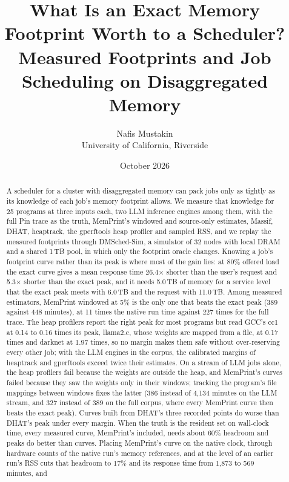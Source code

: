 \documentclass[11pt]{article}
\title{What Is an Exact Memory Footprint Worth to a Scheduler?\\
Measured Footprints and Job Scheduling on Disaggregated Memory}
\author{Nafis Mustakin\\University of California, Riverside}
\date{October 2026}
\newcommand{\memprint}{MemPrint}
\begin{document}
\maketitle

\begin{abstract}
A scheduler for a cluster with disaggregated memory can pack jobs only as tightly as its knowledge of each
job's memory footprint allows. We measure that knowledge for 25 programs at three inputs each, two LLM inference
engines among them, with the full Pin
trace as the truth, \memprint{}'s windowed and source-only estimates, Massif, DHAT, heaptrack, the gperftools heap
profiler and sampled RSS, and we replay the measured footprints through DMSched-Sim, a simulator of 32 nodes with
local DRAM and a shared 1\,TB pool, in which only the footprint oracle changes. Knowing a job's footprint curve
rather than its peak is where most of the gain lies: at 80\% offered load the exact curve gives a mean response
time 26.4$\times$ shorter than the user's request and 5.3$\times$ shorter than the exact peak, and it needs 5.0\,TB
of memory for a service level that the exact peak meets with 6.0\,TB and the request with 11.0\,TB. Among measured
estimators, \memprint{} windowed at 5\% is the only one that beats the exact peak (389 against 448 minutes), at
11 times the native run time against 227 times for the full trace. The heap profilers report the right peak for
most programs but read GCC's cc1 at 0.14 to 0.16 times its peak, llama2.c, whose weights are mapped from a file,
at 0.17 times and darknet at 1.97 times, so no margin makes them safe without over-reserving every other job; with
the LLM engines in the corpus, the calibrated margins of heaptrack and gperftools exceed twice their estimates. On a
stream of LLM jobs alone, the heap profilers fail because the weights are outside the heap, and \memprint{}'s
curves failed because they saw the weights only in their windows; tracking the program's file mappings between
windows fixes the latter (386 instead of 4{,}134 minutes on the LLM stream, and 327 instead of 389 on the full
corpus, where every \memprint{} curve then beats the exact peak). Curves built from DHAT's three recorded points
do worse than DHAT's peak under every margin. When the truth is the resident set on wall-clock time, every
measured curve, \memprint{}'s included, needs about 60\% headroom and peaks do better than curves. Placing
\memprint{}'s curve on the native clock, through hardware counts of the native run's memory references, and at the
level of an earlier run's RSS cuts that headroom to 17\% and its response time from 1{,}873 to 569 minutes, and

\end{abstract}
\end{document}
